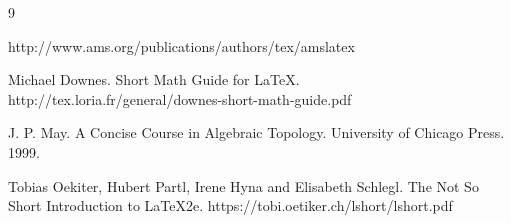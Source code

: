 \documentclass[psamsfonts]{amsart}
\theoremstyle{definition}
\theoremstyle{remark}
\numberwithin{equation}{section}
\begin{document}
\begin{thebibliography}{9}

 http://www.ams.org/publications/authors/tex/amslatex

Michael Downes.
Short Math Guide for \LaTeX.
http://tex.loria.fr/general/downes-short-math-guide.pdf

J. P. May.
A Concise Course in Algebraic Topology.
University of Chicago Press. 1999. 

Tobias Oekiter, Hubert Partl, Irene Hyna and Elisabeth Schlegl.
The Not So Short Introduction to \LaTeX 2e.
https://tobi.oetiker.ch/lshort/lshort.pdf

\end{thebibliography}
\end{document}
